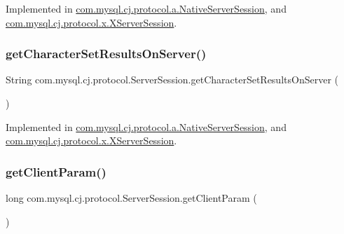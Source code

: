 Implemented in \mbox{\hyperlink{classcom_1_1mysql_1_1cj_1_1protocol_1_1a_1_1_native_server_session_ae60251435377bb750534dd50526e06bb}{com.\+mysql.\+cj.\+protocol.\+a.\+Native\+Server\+Session}}, and \mbox{\hyperlink{classcom_1_1mysql_1_1cj_1_1protocol_1_1x_1_1_x_server_session_abe3c372a1bd8d70a5229778e8cf17a62}{com.\+mysql.\+cj.\+protocol.\+x.\+X\+Server\+Session}}.

\mbox{\label{interfacecom_1_1mysql_1_1cj_1_1protocol_1_1_server_session_a8c4da1a076a82273ca497c1914faf960}} 
\subsubsection{\texorpdfstring{get\+Character\+Set\+Results\+On\+Server()}{getCharacterSetResultsOnServer()}}
{\footnotesize\ttfamily String com.\+mysql.\+cj.\+protocol.\+Server\+Session.\+get\+Character\+Set\+Results\+On\+Server (\begin{DoxyParamCaption}{ }\end{DoxyParamCaption})}



Implemented in \mbox{\hyperlink{classcom_1_1mysql_1_1cj_1_1protocol_1_1a_1_1_native_server_session_a6a563b249faf740d89dc4cf8be9dd0c7}{com.\+mysql.\+cj.\+protocol.\+a.\+Native\+Server\+Session}}, and \mbox{\hyperlink{classcom_1_1mysql_1_1cj_1_1protocol_1_1x_1_1_x_server_session_aee32f7a4b8a0e1fccc0e7fb8bba92d98}{com.\+mysql.\+cj.\+protocol.\+x.\+X\+Server\+Session}}.

\mbox{\label{interfacecom_1_1mysql_1_1cj_1_1protocol_1_1_server_session_a7c64dec4bc0e55be071abce45e3c2ef2}} 
\subsubsection{\texorpdfstring{get\+Client\+Param()}{getClientParam()}}
{\footnotesize\ttfamily long com.\+mysql.\+cj.\+protocol.\+Server\+Session.\+get\+Client\+Param (\begin{DoxyParamCaption}{ }\end{DoxyParamCaption})}



